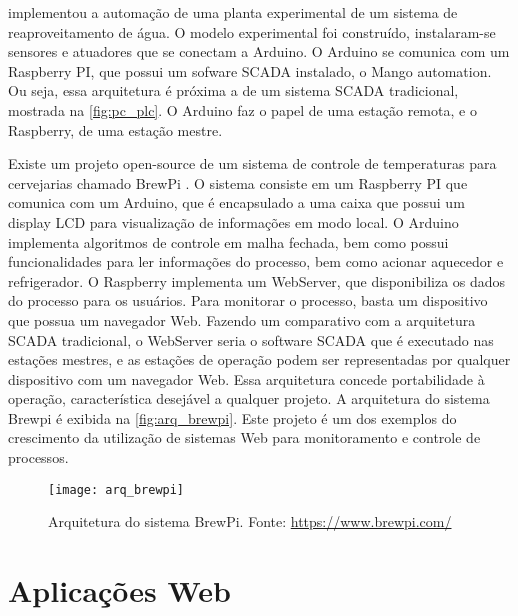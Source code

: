 			\textcite{lucas2016} implementou a automação de uma planta experimental de um sistema de reaproveitamento de água. O modelo experimental foi construído, instalaram-se sensores e atuadores que se conectam a Arduino. O Arduino se comunica com um Raspberry PI, que possui um sofware SCADA instalado, o Mango automation. Ou seja, essa arquitetura é próxima a de um sistema SCADA tradicional, mostrada na \autoref{fig:pc_plc}. O Arduino faz o papel de uma estação remota, e o Raspberry, de uma estação mestre.
			
			Existe um projeto open-source de um sistema de controle de temperaturas para cervejarias chamado BrewPi \cite{brewpi}. O sistema consiste em um Raspberry PI que comunica com um Arduino, que é encapsulado a uma caixa que possui um display LCD para visualização de informações em modo local. O Arduino implementa algoritmos de controle em malha fechada, bem como possui funcionalidades para ler informações do processo, bem como acionar aquecedor e refrigerador. O Raspberry implementa um WebServer, que disponibiliza os dados do processo para os usuários. Para monitorar o processo, basta um dispositivo que possua um navegador Web. Fazendo um comparativo com a arquitetura SCADA tradicional, o WebServer seria o software SCADA que é executado nas estações mestres, e as estações de operação podem ser representadas por qualquer dispositivo com um navegador Web. Essa arquitetura concede portabilidade à operação, característica desejável a qualquer projeto. A arquitetura do sistema Brewpi é exibida na \autoref{fig:arq_brewpi}. Este projeto é um dos exemplos do crescimento da utilização de sistemas Web para monitoramento e controle de processos.
			
			\begin{figure}[!htb]	
				\captionsetup{justification=centering}
				\begin{center}
					\texttt{[image: arq\_brewpi]}  %
					\caption[Arquitetura do sistema BrewPi]{\label{fig:arq_brewpi}Arquitetura do sistema BrewPi. Fonte: \url{https://www.brewpi.com/} }
				\end{center}		
			\end{figure}
		
	\section{Aplicações Web}
	